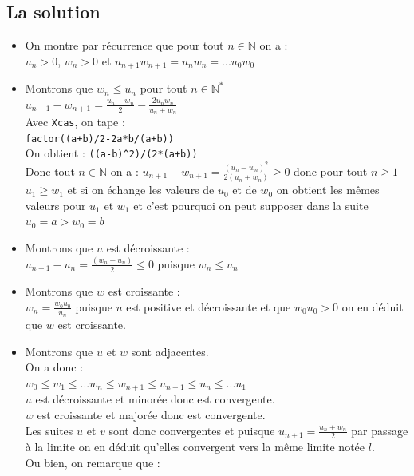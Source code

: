 \documentclass[a4paper,11pt]{book}
\newcommand{\N}{{\mathbb{N}}}
\begin{document}
\subsection{La solution}
\begin{itemize}
\item On montre par r\'ecurrence que pour tout $n\in \N$ on a :\\
$u_n>0$, $w_n>0$ et  $u_{n+1}w_{n+1}=u_nw_n=...u_0w_0$\\
\item Montrons que $w_n\leq u_n$ pour tout $n\in \N^*$ \\
$\displaystyle u_{n+1}-w_{n+1}=\frac{u_n+w_n}{2}-\frac{2u_nw_n}{u_n+w_n}$\\
Avec {\tt Xcas}, on tape :\\
{\tt factor((a+b)/2-2a*b/(a+b))}\\
On obtient : {\tt ((a-b)\verb|^|2)/(2*(a+b))}\\
Donc tout $n\in \N$ on a :
 $\displaystyle u_{n+1}-w_{n+1}=\frac{(u_n-w_n)^2}{2(u_n+w_n)}\geq 0$
donc pour tout $n\geq 1$ $u_1\geq w_1$ et si on \'echange les valeurs de $u_0$
et de $w_0$ on obtient les m\^emes valeurs pour $u_1$ et $w_1$
 et c'est pourquoi on peut supposer dans la suite $u_0=a>w_0=b$\\
\item Montrons que $u$ est d\'ecroissante :\\
$\displaystyle u_{n+1}-u_n=\frac{(w_n-u_n)}{2}\leq 0$ puisque $w_n\leq u_n$ \\
\item Montrons que $w$ est croissante :\\
$\displaystyle w_n=\frac{w_0u_0}{u_n}$ puisque $u$ est positive et d\'ecroissante et que $w_0u_0>0$ on en d\'eduit que $w$ est croissante.\\
\item Montrons que $u$ et $w$ sont adjacentes.\\
On a donc :\\
$w_0\leq w_1\leq...w_n\leq  w_{n+1}  \leq u_{n+1}\leq u_n \leq...u_1$\\
$u$ est d\'ecroissante et minor\'ee donc est convergente.\\
$w$ est croissante et major\'ee donc est convergente.\\
Les suites $u$ et $v$ sont donc convergentes et puisque 
$\displaystyle u_{n+1}=\frac{u_n+w_n}{2}$ par passage \`a la limite on en 
d\'eduit qu'elles convergent vers la m\^eme limite not\'ee $l$.\\
Ou bien, on remarque que :\\

\end{itemize}
\end{document}
